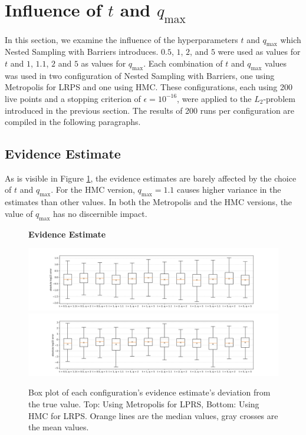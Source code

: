 \documentclass[12pt, a4paper]{report}
\begin{document}
\FloatBarrier
\section{Influence of $t$ and $q_{\textrm{max}}$}
In this section, we examine the influence of the hyperparameters $t$ and $q_{\textrm{max}}$ which Nested Sampling with Barriers introduces.
$0.5$, $1$, $2$, and $5$ were used as values for $t$ and $1$, $1.1$, $2$ and $5$ as values for $q_{\textrm{max}}$.
Each combination of $t$ and $q_{\textrm{max}}$ values was used in two configuration of Nested Sampling with Barriers, one using Metropolis for LRPS and one using HMC.
These configurations, each using 200 live points and a stopping criterion of $\epsilon=10^{-16}$, were applied to the $L_2$-problem introduced in the previous section.
The results of 200 runs per configuration are compiled in the following paragraphs.

\subsection{Evidence Estimate}
As is visible in Figure \ref{fig:results_params_logZ}, the evidence estimates are barely affected by the choice of $t$ and $q_{\textrm{max}}$.
For the HMC version, $q_{\textrm{max}} = 1.1$ causes higher variance in the estimates than other values.
In both the Metropolis and the HMC versions, the value of $q_{\textrm{max}}$ has no discernible impact.
\begin{figure}
    \centering
    {\small \textbf{Evidence Estimate} \par}
    \includegraphics[trim={3cm 0cm 3cm 0cm}, clip, width=\textwidth]{figs/results/params/logZ_diffs_metropolis.png}
    \includegraphics[trim={3cm 0cm 3cm 0cm}, clip, width=\textwidth]{figs/results/params/logZ_diffs_hmc.png}
    \caption{Box plot of each configuration's evidence estimate's deviation from the true value. Top: Using Metropolis for LPRS, Bottom: Using HMC for LRPS. Orange lines are the median values, gray crosses are the mean values.}
    \label{fig:results_params_logZ}
\end{figure}
\end{document}
